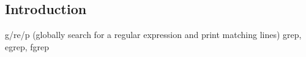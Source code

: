 
\subsection{Introduction}
g/re/p (globally search for a regular expression and print matching lines)
grep, egrep, fgrep

